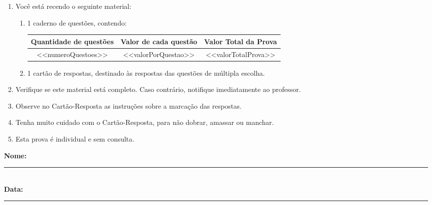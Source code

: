 \documentclass[12pt, a4paper]{article}
\begin{document}
\begin{enumerate}[label=\bfseries\arabic*. , wide, labelwidth=!, labelindent=0pt, leftmargin=*]
    \item Você está recendo o seguinte material:
        \begin{enumerate}[label=\alph*)]
            \item 1 caderno de questões, contendo: \\
            \begin{center}
                \begin{tabular}{|c|c|c|} \hline
                    \textbf{Quantidade de questões} & \textbf{Valor de cada questão} & \textbf{Valor Total da Prova} \\ \hline
                    <<numeroQuestoes>> & <<valorPorQuestao>> & <<valorTotalProva>> \\ \hline
                \end{tabular}
            \end{center}
            \item 1 cartão de respostas, destinado às respostas das questões de múltipla escolha.
        \end{enumerate}
    \item Verifique se este material está completo. Caso contrário, notifique imediatamente ao professor.
    \item Observe no Cartão-Resposta as instruções sobre a marcação das respostas.
    \item Tenha muito cuidado com o Cartão-Resposta, para não dobrar, amassar ou manchar.
    \item Esta prova é individual e sem consulta.
\end{enumerate}
\vspace{0.5cm}
\noindent\textbf{Nome:} \rule{0.8\textwidth}{0.4pt} \\
\vspace{0.5cm}
\noindent\textbf{Data:} \rule{0.4\textwidth}{0.4pt}
\newpage
\end{document}
